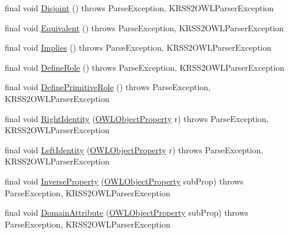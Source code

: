 \begin{DoxyCompactItemize}
\item 
final void \hyperlink{classde_1_1uulm_1_1ecs_1_1ai_1_1owlapi_1_1krssparser_1_1_k_r_s_s2_parser_a379165b7dbd0d0271ca918fd0bf48276}{Disjoint} ()  throws Parse\-Exception, K\-R\-S\-S2\-O\-W\-L\-Parser\-Exception 
\item 
final void \hyperlink{classde_1_1uulm_1_1ecs_1_1ai_1_1owlapi_1_1krssparser_1_1_k_r_s_s2_parser_a1ee37497e84640499b7fdf9190319abe}{Equivalent} ()  throws Parse\-Exception, K\-R\-S\-S2\-O\-W\-L\-Parser\-Exception 
\item 
final void \hyperlink{classde_1_1uulm_1_1ecs_1_1ai_1_1owlapi_1_1krssparser_1_1_k_r_s_s2_parser_a8c9a01dc17a20db4f4ef16fcb1011c83}{Implies} ()  throws Parse\-Exception, K\-R\-S\-S2\-O\-W\-L\-Parser\-Exception 
\item 
final void \hyperlink{classde_1_1uulm_1_1ecs_1_1ai_1_1owlapi_1_1krssparser_1_1_k_r_s_s2_parser_af67af8cf2302ca5f5d0ffe124a466153}{Define\-Role} ()  throws Parse\-Exception, K\-R\-S\-S2\-O\-W\-L\-Parser\-Exception 
\item 
final void \hyperlink{classde_1_1uulm_1_1ecs_1_1ai_1_1owlapi_1_1krssparser_1_1_k_r_s_s2_parser_aa1b26c712adb0f363041a76c9e7665c5}{Define\-Primitive\-Role} ()  throws Parse\-Exception,     K\-R\-S\-S2\-O\-W\-L\-Parser\-Exception 
\item 
final void \hyperlink{classde_1_1uulm_1_1ecs_1_1ai_1_1owlapi_1_1krssparser_1_1_k_r_s_s2_parser_a00b8be6dc36521cf224303ad646f02a7}{Right\-Identity} (\hyperlink{interfaceorg_1_1semanticweb_1_1owlapi_1_1model_1_1_o_w_l_object_property}{O\-W\-L\-Object\-Property} r)  throws Parse\-Exception,     K\-R\-S\-S2\-O\-W\-L\-Parser\-Exception 
\item 
final void \hyperlink{classde_1_1uulm_1_1ecs_1_1ai_1_1owlapi_1_1krssparser_1_1_k_r_s_s2_parser_a0ec6c9bc4a789758649c3f7f68ca2476}{Left\-Identity} (\hyperlink{interfaceorg_1_1semanticweb_1_1owlapi_1_1model_1_1_o_w_l_object_property}{O\-W\-L\-Object\-Property} r)  throws Parse\-Exception,     K\-R\-S\-S2\-O\-W\-L\-Parser\-Exception 
\item 
final void \hyperlink{classde_1_1uulm_1_1ecs_1_1ai_1_1owlapi_1_1krssparser_1_1_k_r_s_s2_parser_a730efcb7e4f1ba37475aa078c8e2ce77}{Inverse\-Property} (\hyperlink{interfaceorg_1_1semanticweb_1_1owlapi_1_1model_1_1_o_w_l_object_property}{O\-W\-L\-Object\-Property} sub\-Prop)  throws Parse\-Exception,     K\-R\-S\-S2\-O\-W\-L\-Parser\-Exception 
\item 
final void \hyperlink{classde_1_1uulm_1_1ecs_1_1ai_1_1owlapi_1_1krssparser_1_1_k_r_s_s2_parser_a4754b9eb5a44c12a2a7a94723b41de5f}{Domain\-Attribute} (\hyperlink{interfaceorg_1_1semanticweb_1_1owlapi_1_1model_1_1_o_w_l_object_property}{O\-W\-L\-Object\-Property} sub\-Prop)  throws Parse\-Exception,     K\-R\-S\-S2\-O\-W\-L\-Parser\-Exception 

\end{DoxyCompactItemize}
